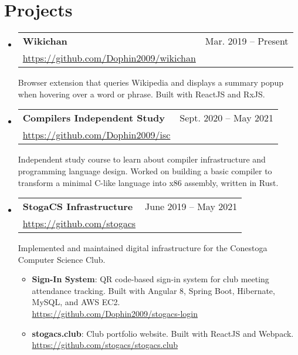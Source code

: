 \documentclass[letterpaper,11pt]{article}
\makeatletter
\newcommand{\resumeSubheading}[4]{
  \vspace{-1pt}\item
    \begin{tabular*}{0.97\textwidth}[t]{l@{\extracolsep{\fill}}r}
      \textbf{#1} & #2 \\
      {\small#3} & \textit{\small #4} \\[3pt]
    \end{tabular*}\vspace{-5pt}
}
\newenvironment{resumeSubHeadingList}{\begin{itemize}[leftmargin=*, label={}]}{\end{itemize}}
\newenvironment{resumeItemList}{\vspace{-2pt}\begin{itemize}}{\end{itemize}\vspace{-5pt}}
\newcommand{\resumeItem}[2]{\item\small{\textbf{#1}{: #2 \vspace{-2pt}}}}
\makeatother
\begin{document}
\section{Projects}

  \begin{resumeSubHeadingList}
    \resumeSubheading%
      {Wikichan}{Mar. 2019 -- Present}
      {\url{https://github.com/Dophin2009/wikichan}}{}

      Browser extension that queries Wikipedia and displays a summary popup when hovering over a
        word or phrase. Built with ReactJS and RxJS.

    \resumeSubheading%
      {Compilers Independent Study}{Sept. 2020 -- May 2021}
      {\url{https://github.com/Dophin2009/isc}}{}

      Independent study course to learn about compiler infrastructure and programming language
        design. Worked on building a basic compiler to transform a minimal C-like language into x86
        assembly, written in Rust.

    \resumeSubheading%
      {StogaCS Infrastructure}{June 2019 -- May 2021}
      {\url{https://github.com/stogacs}}{}

      Implemented and maintained digital infrastructure for the Conestoga Computer Science Club.
      \begin{resumeItemList}
        \resumeItem{Sign-In System}
          {QR code-based sign-in system for club meeting attendance tracking.  Built with
            Angular 8, Spring Boot, Hibernate, MySQL, and AWS EC2. \\
            \url{https://github.com/Dophin2009/stogacs-login}}
        \resumeItem{stogacs.club}
          {Club portfolio website. Built with ReactJS and Webpack. \\
            \url{https://github.com/stogacs/stogacs.club}}
      \end{resumeItemList}
  \end{resumeSubHeadingList}


\end{document}
